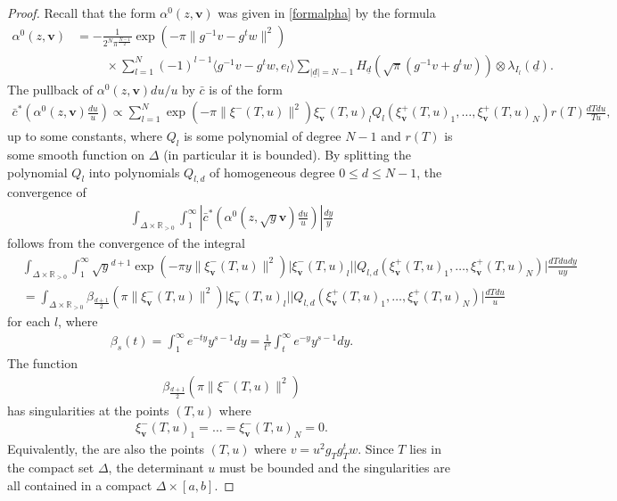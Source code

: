 \documentclass[twoside,a4paper,10pt]{article} %
\newcommand{\uud}{\underline{d}}
\newcommand{\8}{\infty}
\newcommand{\vbf}{\mathbf{v}}
\newcommand{\R}{\mathbb{R}}
\theoremstyle{mytheoremstyle}
\theoremstyle{remark}
\numberwithin{equation}{section}
\begin{document}
\begin{proof}
Recall that the form $\alpha^0(z,\vbf)$ was given in \eqref{formalpha} by the formula
\begin{align} 
\alpha^0(z,\vbf)& =-\frac{1}{2^{N}\pi^{\frac{N-1}{2}}} \exp \left (-\pi \lVert g^{-1}v - g^t w \rVert^2 \right )  \\
& \hspace{1cm} \times\sum_{l=1}^N (-1)^{l-1} \langle g^{-1}v-g^t w, e_l \rangle  \sum_{\vert \uud \vert=N-1} H_{\uud}(\sqrt{\pi}(g^{-1}v+g^t w)) \otimes \lambda_{I_l}(\uud).
\end{align}
The pullback of $\alpha^0(z,\vbf)du/u$ by $\bar{c}$ is of the form
\begin{align}
\bar{c}^\ast \left ( \alpha^0(z,\vbf) \frac{du}{u} \right ) \propto \sum_{l=1}^N \exp \left (-\pi \lVert \xi^-(T,u) \rVert^2 \right ) \xi^-_\vbf(T,u)_l  Q_l(\xi^+_\vbf(T,u)_1,\dots,\xi^+_\vbf(T,u)_N)r(T)  \frac{dTdu}{Tu},
\end{align}
up to some constants, where $Q_l$ is some polynomial of degree $N-1$ and $r(T)$ is some smooth function on $\Delta$ (in particular it is bounded). By splitting the polynomial $Q_l$ into polynomials $Q_{l,d}$ of homogeneous degree $0 \leq d \leq N-1$, the convergence of 
\begin{align}
\int_{\Delta \times \R_{>0}}  \int_1^\8   \left \vert \bar{c}^\ast \left ( \alpha^0(z,\sqrt{y}\vbf) \frac{du}{u}  \right ) \right \vert\frac{dy}{y}
\end{align} follows from the convergence of the integral
\begin{align}
& \int_{\Delta \times \R_{>0}} \int_1^\8 \sqrt{y}^{d+1} \exp \left (-\pi y \lVert \xi_\vbf^-(T,u) \rVert^2 \right ) \vert \xi^-_\vbf(T,u)_l \vert  \vert Q_{l,d}(\xi^+_\vbf(T,u)_1,\dots,\xi^+_\vbf(T,u)_N) \vert \frac{dTdudy}{uy} \\
&= \int_{\Delta \times \R_{>0}} \beta_{\frac{d+1}{2}} \left (\pi \lVert \xi^-_\vbf(T,u) \rVert^2 \right ) \vert \xi^-_\vbf(T,u)_l \vert  \vert Q_{l,d}(\xi^+_\vbf(T,u)_1,\dots,\xi^+_\vbf(T,u)_N) \vert \frac{dTdu}{u}
\end{align}
for each $l$, where 
\begin{align}
\beta_{s}(t)=\int_1^\8e^{-ty}y^{s-1}dy=\frac{1}{t^s}\int_t^\8e^{-y}y^{s-1}dy.
\end{align} 
The function
\begin{align}
\beta_{\frac{d+1}{2}} \left (\pi \lVert \xi^-(T,u) \rVert^2 \right )
\end{align}
has singularities at the points $(T,u)$ where
\begin{align}
\xi^-_\vbf(T,u)_1=\dots=\xi^-_\vbf(T,u)_N=0.
\end{align}
Equivalently, the are also the points $(T,u)$ where $v=u^2g_Tg_T^tw$. Since  $T$ lies in the compact set $\Delta$, the determinant $u$ must be bounded and the singularities are all contained in a compact $\Delta \times [a,b]$.



\end{proof}
\end{document}
